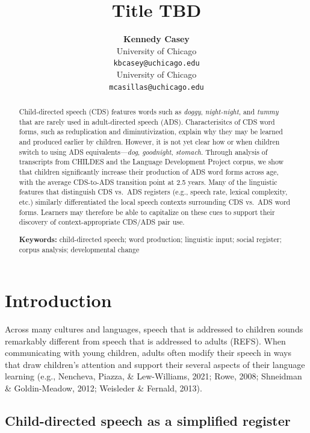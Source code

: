 \documentclass[10pt, letterpaper]{article}
\title{Title TBD}
\author{{\large \bf Kennedy Casey} \\ University of Chicago \\ \texttt{kbcasey@uchicago.edu} \And {\large \bf Marisa Casillas} \\ University of Chicago \\ \texttt{mcasillas@uchicago.edu}}
\begin{document}
\maketitle

\begin{abstract}
Child-directed speech (CDS) features words such as \emph{doggy},
\emph{night-night}, and \emph{tummy} that are rarely used in
adult-directed speech (ADS). Characterisitcs of CDS word forms, such as
reduplication and diminutivization, explain why they may be learned and
produced earlier by children. However, it is not yet clear how or when
children switch to using ADS equivalents---\emph{dog}, \emph{goodnight},
\emph{stomach}. Through analysis of transcripts from CHILDES and the
Language Development Project corpus, we show that children significantly
increase their production of ADS word forms across age, with the average
CDS-to-ADS transition point at 2.5 years. Many of the linguistic
features that distinguish CDS vs.~ADS registers (e.g., speech rate,
lexical complexity, etc.) similarly differentiated the local speech
contexts surrounding CDS vs.~ADS word forms. Learners may therefore be
able to capitalize on these cues to support their discovery of
context-appropriate CDS/ADS pair use.

\textbf{Keywords:}
child-directed speech; word production; linguistic input; social
register; corpus analysis; developmental change
\end{abstract}

\hypertarget{introduction}{%
\section{Introduction}\label{introduction}}

Across many cultures and languages, speech that is addressed to children
sounds remarkably different from speech that is addressed to adults
(REFS). When communicating with young children, adults often modify
their speech in ways that draw children's attention and support their
several aspects of their language learning (e.g., Nencheva, Piazza, \&
Lew-Williams, 2021; Rowe, 2008; Shneidman \& Goldin-Meadow, 2012;
Weisleder \& Fernald, 2013).

\hypertarget{child-directed-speech-as-a-simplified-register}{%
\subsection{Child-directed speech as a simplified
register}\label{child-directed-speech-as-a-simplified-register}}
\end{document}
